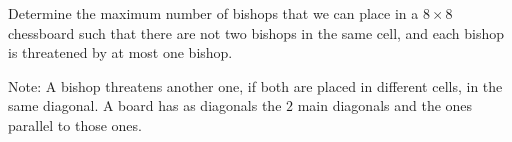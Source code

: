 Determine the maximum number of bishops that we can place in a $8 \times 8$ chessboard such that there are not two bishops in the same cell, and each bishop is threatened by at most one bishop.

Note: A bishop threatens another one, if both are placed in different cells, in the same diagonal. A board has as diagonals the $2$ main diagonals and the ones parallel to those ones.